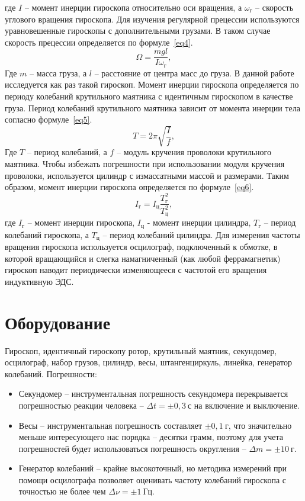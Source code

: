 \documentclass[a4paper,11pt]{article}
\begin{document}
где $I$ -- момент инерции гироскопа относительно оси вращения, а $\omega_{г}$ -- скорость углового вращения гироскопа.\newline
Для изучения регулярной прецессии используются уравновешенные гироскопы с дополнительными грузами. В таком случае скорость прецессии определяется по формуле~\ref{eq4}.\newline
\begin{equation}    \label{eq4}
  \Omega = \frac{mgl}{I \omega_{г}},
\end{equation}
Где $m$ -- масса груза, а $l$ -- расстояние от центра масс до груза.\newline
В данной работе исследуется как раз такой гироскоп. Момент инерции гироскопа определяется по периоду колебаний крутильного маятника с идентичным гироскопом в качестве груза. Период колебаний крутильного маятника зависит от момента инерции тела согласно формуле~\ref{eq5}.\newline
\begin{equation}    \label{eq5}
  T = 2 \pi \sqrt{\frac{I}{f}},
\end{equation}
Где $T$ -- период колебаний, а $f$ -- модуль кручения проволоки крутильного маятника.\newline
Чтобы избежать погрешности при использовании модуля кручения проволоки, используется цилиндр с измассатными массой и размерами. Таким образом, момент инерции гироскопа определяется по формуле~\ref{eq6}.\newline
\begin{equation}    \label{eq6}
  I_{г}=I_{ц}\frac{T_{г}^{2}}{T_{ц}^{2}},
\end{equation}
где $I_{г}$ -- момент инерции гироскопа, $I_{ц}$ - момент инерции цилиндра, $T_{г}$ -- период колебаний гироскопа, а $T_{ц}$ -- период колебаний цилиндра.\newline
Для измерения частоты вращения гироскопа используется осцилограф, подключенный к обмотке, в которой вращающийся и слегка намагниченный (как любой феррамагнетик) гироскоп наводит периодически изменяющееся с частотой его вращения индуктивную ЭДС.
\section{Оборудование}
Гироскоп, идентичный гироскопу ротор, крутильный маятник, секундомер, осцилограф, набор грузов, цилиндр, весы, штангенциркуль, линейка, генератор колебаний.\newline
Погрешности:
\begin{itemize}
        \item Секундомер -- инструментальная погрешность секундомера перекрывается погрешностью реакции человека -- $\Delta t = \pm 0,3\ с$ на включение и выключение.
        \item Весы -- инструментальная погрешность составляет $\pm 0,1\ г$, что значительно меньше интересующего нас порядка -- десятки грамм, поэтому для учета погрешностей будет использоваться погрешность округления -- $\Delta m = \pm 10\ г$.
        \item Генератор колебаний -- крайне высокоточный, но методика измерений при помощи осцилографа позволяет оценивать частоту колебаний гироскопа с точностью не более чем $\Delta \nu = \pm 1\ Гц$.
\end{itemize}
\end{document}
